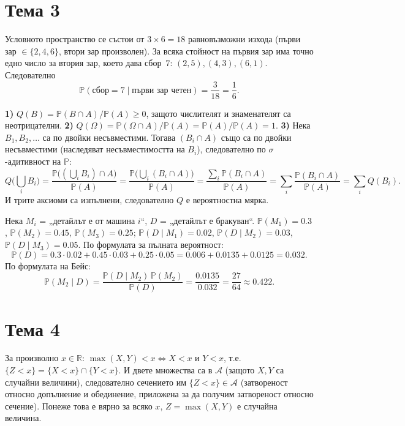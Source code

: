 \section*{Тема 3}

\begin{proofbox}
Условното пространство се състои от $3\times6=18$ равновъзможни
изхода (първи зар $\in\{2,4,6\}$, втори зар произволен). За всяка
стойност на първия зар има точно едно число за втория зар, което
дава сбор~$7$: $(2,5),(4,3),(6,1)$. Следователно
\[
  \mathbb P(\text{сбор}=7 \mid \text{първи зар четен}) = \frac3{18}
  = \frac16.
\]
\end{proofbox}

\begin{proofbox}
\textbf{1)} $Q(B)=\mathbb P(B\cap A)/\mathbb P(A)\ge0$, защото
числителят и знаменателят са неотрицателни. \textbf{2)} $Q(\Omega)=
\mathbb P(\Omega\cap A)/\mathbb P(A) = \mathbb P(A)/\mathbb P(A)=1$.
\textbf{3)} Нека $B_1,B_2,\dots$ са по двойки несъвместими. Тогава
$(B_i\cap A)$ също са по двойки несъвместими (наследяват
несъвместимостта на $B_i$), следователно по $\sigma$-адитивност на
$\mathbb P$:
\[
  Q\Big(\bigcup_i B_i\Big) = \frac{\mathbb P\big((\bigcup_iB_i)\cap A
  \big)}{\mathbb P(A)} = \frac{\mathbb P\big(\bigcup_i(B_i\cap A)
  \big)}{\mathbb P(A)} = \frac{\sum_i \mathbb P(B_i\cap A)}{\mathbb
  P(A)} = \sum_i \frac{\mathbb P(B_i\cap A)}{\mathbb P(A)} = \sum_i
  Q(B_i).
\]
И трите аксиоми са изпълнени, следователно $Q$ е вероятностна мярка.
\qedbg
\end{proofbox}

\begin{proofbox}
Нека $M_i$ = „детайлът е от машина $i$“, $D$ = „детайлът е бракуван“.
$\mathbb P(M_1)=0.3$, $\mathbb P(M_2)=0.45$, $\mathbb P(M_3)=0.25$;
$\mathbb P(D\mid M_1)=0.02$, $\mathbb P(D\mid M_2)=0.03$, $\mathbb
P(D\mid M_3)=0.05$. По формулата за пълната вероятност:
\[
  \mathbb P(D) = 0.3\cdot0.02+0.45\cdot0.03+0.25\cdot0.05 = 0.006+
  0.0135+0.0125 = 0.032.
\]
По формулата на Бейс:
\[
  \mathbb P(M_2\mid D) = \frac{\mathbb P(D\mid M_2)\,\mathbb P(M_2)}
  {\mathbb P(D)} = \frac{0.0135}{0.032} = \frac{27}{64} \approx
  0.422.
\]
\end{proofbox}

\section*{Тема 4}

\begin{proofbox}
За произволно $x\in\mathbb R$: $\max(X,Y)<x \iff X<x \text{ и } Y<x$,
т.е.\ $\{Z<x\}=\{X<x\}\cap\{Y<x\}$. И двете множества са в $\mathcal
A$ (защото $X,Y$ са случайни величини), следователно сечението им
$\{Z<x\}\in\mathcal A$ (затвореност относно допълнение и обединение,
приложена за да получим затвореност относно сечение). Понеже това е
вярно за всяко $x$, $Z=\max(X,Y)$ е случайна величина. \qedbg
\end{proofbox}


